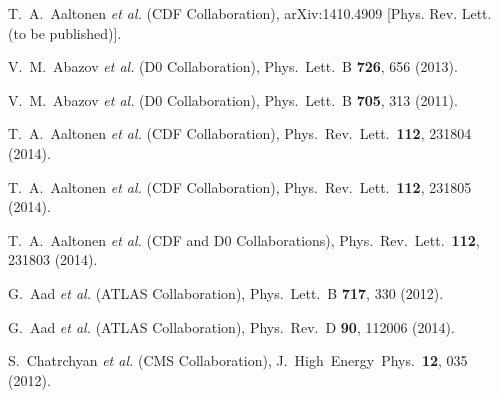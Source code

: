 \documentclass[aps,prl,twocolumn,showpacs,superscriptaddress,groupedaddress]{revtex4}  %
\begin{document}
\begin{thebibliography}{99}
  T.~A.~Aaltonen {\it et al.}  (CDF Collaboration),
  arXiv:1410.4909 [Phys. Rev. Lett. (to be published)].

  V.~M.~Abazov {\it et al.}  (D0 Collaboration),
  Phys.\ Lett.\ B {\bf 726}, 656 (2013).

  V.~M.~Abazov {\it et al.}  (D0 Collaboration),
  Phys.\ Lett.\ B {\bf 705}, 313 (2011).

  T.~A.~Aaltonen {\it et al.}  (CDF Collaboration),
  Phys.\ Rev.\ Lett.\  {\bf 112}, 231804 (2014).

  T.~A.~Aaltonen {\it et al.}  (CDF Collaboration),
  Phys.\ Rev.\ Lett.\  {\bf 112}, 231805 (2014).

  T.~A.~Aaltonen {\it et al.}  (CDF and D0 Collaborations),
  Phys.\ Rev.\ Lett.\  {\bf 112}, 231803 (2014).

  G.~Aad {\it et al.}  (ATLAS Collaboration),
  Phys.\ Lett.\ B {\bf 717}, 330 (2012).

  G.~Aad {\it et al.}  (ATLAS Collaboration),
Phys.\ Rev.\ D {\bf 90}, 112006 (2014).

  S.~Chatrchyan {\it et al.}  (CMS Collaboration),
  J.\ High\ Energy\ Phys.\ {\bf 12}, 035 (2012).


\end{thebibliography}
\end{document}
